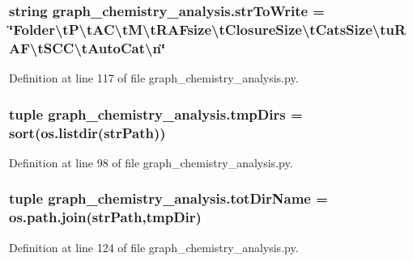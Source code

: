 \hypertarget{a00103_ac8b74f709a3b83c74a10e0ca5b55d041}{
\subsubsection[{str\-To\-Write}]{\setlength{\rightskip}{0pt plus 5cm}string graph\-\_\-chemistry\-\_\-analysis.\-str\-To\-Write = \char`\"{}Folder\textbackslash{}t\-P\textbackslash{}t\-A\-C\textbackslash{}t\-M\textbackslash{}t\-R\-A\-Fsize\textbackslash{}t\-Closure\-Size\textbackslash{}t\-Cats\-Size\textbackslash{}tu\-R\-A\-F\textbackslash{}t\-S\-C\-C\textbackslash{}t\-Auto\-Cat\textbackslash{}n\char`\"{}}}\label{a00103_ac8b74f709a3b83c74a10e0ca5b55d041}


Definition at line 117 of file graph\-\_\-chemistry\-\_\-analysis.\-py.

\hypertarget{a00103_a16a858871fb81c4d23fa4bb57a438b6d}{
\subsubsection[{tmp\-Dirs}]{\setlength{\rightskip}{0pt plus 5cm}tuple graph\-\_\-chemistry\-\_\-analysis.\-tmp\-Dirs = sort(os.\-listdir({\bf str\-Path}))}}\label{a00103_a16a858871fb81c4d23fa4bb57a438b6d}


Definition at line 98 of file graph\-\_\-chemistry\-\_\-analysis.\-py.

\hypertarget{a00103_aaceb851a0cb09285621f45da6fc25ddf}{
\subsubsection[{tot\-Dir\-Name}]{\setlength{\rightskip}{0pt plus 5cm}tuple graph\-\_\-chemistry\-\_\-analysis.\-tot\-Dir\-Name = os.\-path.\-join({\bf str\-Path},tmp\-Dir)}}\label{a00103_aaceb851a0cb09285621f45da6fc25ddf}


Definition at line 124 of file graph\-\_\-chemistry\-\_\-analysis.\-py.


